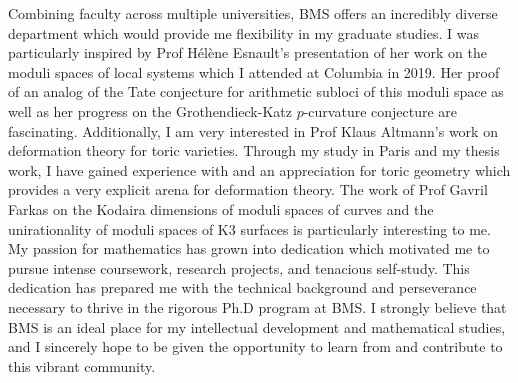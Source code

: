 \documentclass[11pt]{article}
\begin{document}
\par
Combining faculty across multiple universities, BMS offers an incredibly diverse department which would provide me flexibility in my graduate studies. I was particularly inspired by Prof H\'{e}l\`{e}ne Esnault's presentation of her work on the moduli spaces of local systems which I attended at Columbia in 2019. Her proof of an analog of the Tate conjecture for arithmetic subloci of this moduli space as well as her progress on the Grothendieck-Katz $p$-curvature conjecture are fascinating. Additionally, I am very interested in Prof Klaus Altmann's work on deformation theory for toric varieties. Through my study in Paris and my thesis work, I have gained experience with and an appreciation for toric geometry which provides a very explicit arena for deformation theory. The work of Prof Gavril Farkas on the Kodaira dimensions of moduli spaces of curves and the unirationality of moduli spaces of K3 surfaces is particularly interesting to me.  My passion for mathematics has grown into dedication which motivated me to pursue intense coursework, research projects, and tenacious self-study. This dedication has prepared me with the technical background and perseverance necessary to thrive in the rigorous Ph.D program at BMS. I strongly believe that BMS is an ideal place for my intellectual development and mathematical studies, and I sincerely hope to be given the opportunity to learn from and contribute to this vibrant community. 
\end{document}
